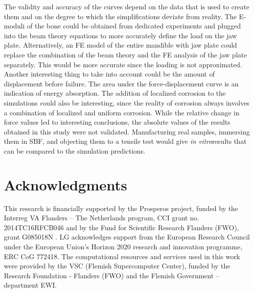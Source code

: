 The validity and accuracy of the curves depend on the data that is used to create them and on the degree to which the simplifications deviate from reality. The E-moduli of the bone could be obtained from dedicated experiments and plugged into the beam theory equations to more accurately define the load on the jaw plate. Alternatively, an FE model of the entire mandible with jaw plate could replace the combination of the beam theory and the FE analysis of the jaw plate separately. This would be more accurate since the loading is not approximated. Another interesting thing to take into account could be the amount of displacement before failure. The area under the force-displacement curve is an indication of energy absorption. The addition of localized corrosion to the simulations could also be interesting, since the reality of corrosion always involves a combination of localized and uniform corrosion. While the relative change in force values led to interesting conclusions, the absolute values of the results obtained in this study were not validated. Manufacturing real samples, immersing them in SBF, and objecting them to a tensile test would give \textit{in vitro}results that can be compared to the simulation predictions.


\section*{Acknowledgments}

This research is financially supported by the Prosperos project, funded by the Interreg VA Flanders – The Netherlands program, CCI grant no. 2014TC16RFCB046 and by the Fund for Scientific Research Flanders (FWO), grant G085018N . LG acknowledges support from the European Research Council under the European Union’s Horizon 2020 research and innovation programme, ERC CoG 772418. The computational resources and services used in this work were provided by the VSC (Flemish Supercomputer Center), funded by the Research Foundation - Flanders (FWO) and the Flemish Government – department EWI.


\cleardoublepage
